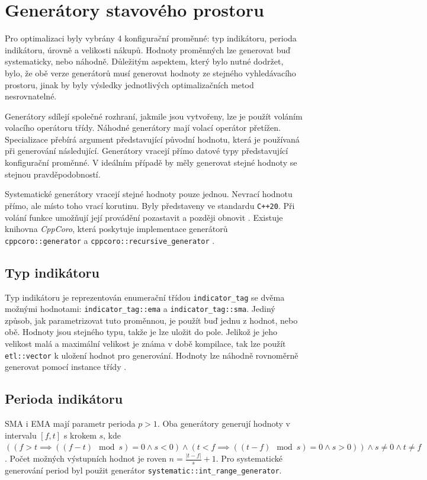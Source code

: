 \chapter{Generátory stavového prostoru}

Pro optimalizaci byly vybrány 4 konfigurační proměnné: typ indikátoru, perioda indikátoru, úrovně a velikosti nákupů.
Hodnoty proměnných lze generovat buď systematicky, nebo náhodně.
Důležitým aspektem, který bylo nutné dodržet, bylo, že obě verze generátorů musí generovat hodnoty ze stejného vyhledávacího prostoru, jinak by byly výsledky jednotlivých optimalizačních metod nesrovnatelné.

Generátory sdílejí společné rozhraní, jakmile jsou vytvořeny, lze je použít voláním volacího operátoru třídy.
Náhodné generátory mají volací operátor přetížen.
Specializace přebírá argument představující původní hodnotu, která je používaná při generování následující.
Generátory vracejí přímo datové typy představující konfigurační proměnné.
V ideálním případě by měly generovat stejné hodnoty se stejnou pravděpodobností.

Systematické generátory vracejí stejné hodnoty pouze jednou.
Nevrací hodnotu přímo, ale místo toho vrací korutinu.
Byly představeny ve standardu \texttt{C++20}.
Při volání funkce umožňují její provádění pozastavit a později obnovit \cite{coroutines}.
Existuje knihovna \textit{CppCoro}, která poskytuje implementace generátorů \texttt{cppcoro::generator} a \texttt{cppcoro::recursive\_generator} \cite{cppcoro}.

\section{Typ indikátoru}
Typ indikátoru je reprezentován enumerační třídou \texttt{indicator\_tag} se dvěma možnými hodnotami: \texttt{indicator\_tag::ema} a \texttt{indicator\_tag::sma}.
Jediný způsob, jak parametrizovat tuto proměnnou, je použít buď jednu z hodnot, nebo obě.
Hodnoty jsou stejného typu, takže je lze uložit do pole.
Jelikož je jeho velikost malá a maximální velikost je známa v době kompilace, tak lze použít \texttt{etl::vector} k uložení hodnot pro generování.
Hodnoty lze náhodně rovnoměrně generovat pomocí instance třídy .

\section{Perioda indikátoru}
SMA i EMA mají parametr perioda $p>1$.
Oba generátory generují hodnoty v intervalu $[f, t]$ s krokem $s$, kde $((f>t\implies((f-t) \mod s)=0 \land s<0) \land (t<f\implies((t-f) \mod s)=0 \land s>0)) \land s\neq0 \land t\neq f$.
Počet možných výstupních hodnot je roven $n=\frac{|t-f|}{s}+1$.
Pro systematické generování period byl použit generátor \texttt{systematic::int\_range\_generator}.

